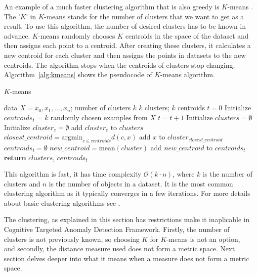\documentclass[thesis=B,english]{FITthesis}[2012/10/20]
\begin{document}
An example of a much faster clustering algorithm that is also greedy is $K$-means \cite{guttag2016introduction}.
The '$K$' in $K$-means stands for the number of clusters that we want to get as a result.
To use this algorithm, the number of desired clusters has to be known in advance.
$K$-means randomly chooses $K$ centroids in the space of the dataset and then assigns each point to a centroid.
After creating these clusters, it calculates a new centroid for each cluster and then assigns the points in datasets to the new centroids.
The algorithm stops when the centroids of clusters stop changing.
Algorithm~\ref{alg:kmeans} shows the pseudocode of $K$-means algorithm.

\begin{algorithm}[t]\label{alg:kmeans}
    \caption{$K$-means}
    \label{k_mean_pseudocode}
    \begin{algorithmic}[1]
        \INPUT data $X = x_0, x_1, ..., x_n$; number of clusters $k$
        \OUTPUT $k$ clusters; $k$ centroids
        \STATE $t = 0$
        \STATE Initialize $centroids_t$ = $k$ randomly chosen examples from $X$
        \DO
            \STATE $t = t + 1$
            \STATE Initialize $clusters = \emptyset$
                \STATE Initialize $cluster_c = \emptyset$
                \STATE add $cluster_c$ to $clusters$
            \ENDFOR
                \STATE $closest\_centroid = \mathrm{argmin}_{c \in centroids} d(c, x)$
                \STATE add $x$ to $cluster_{closest\_centroid}$
            \ENDFOR
            \STATE $centroids_t = \emptyset$
                \STATE $new\_centroid  = \mathrm{mean}(cluster)$
                \STATE add $new\_centroid$ to $centroids_t$
            \ENDFOR
        \STATE \textbf{return} $clusters$, $centroids_t$

    \end{algorithmic}
\end{algorithm}

This algorithm is fast, it has time complexity $\mathcal{O}(k \cdot n)$, where $k$ is the  number of clusters and $n$ is the number of objects in a dataset.
It is the most common clustering algorithm as it typically converges in a few iterations.
For more details about basic clustering algorithms see \cite{guttag2016introduction}.

The clustering, as explained in this section has restrictions make it inaplicable in Cognitive Targeted Anomaly Detection Framework.
Firstly, the number of clusters is not previously known, so choosing $K$ for $K$-means is not an option, and secondly, the distance measure used does not form a metric space.
Next section delves deeper into what it means when a measure does not form a metric space.
\end{document}
